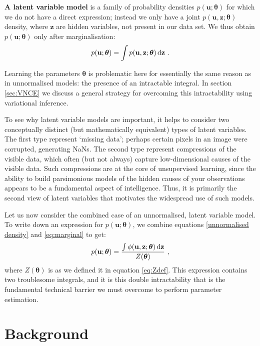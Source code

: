\documentclass[11pt, oneside]{article}
\newcommand{\thetab}{{\boldsymbol{\theta}}}
\newcommand{\pnorm}{p}
\newcommand{\pnn}{\phi}
\renewcommand{\u}{{\mathbf u}}
\newcommand{\z}{{\mathbf z}}
\theoremstyle{definition}
\begin{document}
\textbf{A latent variable model} is a family of probability densities $\pnorm(\u; \thetab)$ for which we do not have a direct expression; instead we only have a joint $\pnorm(\u, \z; \thetab)$ density, where $\z$ are hidden variables, not present in our data set. We thus obtain $\pnorm(\u; \thetab)$ only after marginalisation:
\begin{align}
  \pnorm(\u; \thetab) = \int \pnorm(\u, \z;\thetab) \dif \z \ .
  \label{eq:marginal}
\end{align}

Learning the parameters $\thetab$ is problematic here for essentially the same reason as in unnormalised models: the presence of an intractable integral. In section \ref{sec:VNCE} we discuss a general strategy for overcoming this intractability using variational inference.

To see why latent variable models are important, it helps to consider two conceptually distinct (but mathematically equivalent) types of latent variables. The first type represent `missing data’; perhaps certain pixels in an image were corrupted, generating NaNs. The second type represent compressions of the visible data, which often (but not always) capture low-dimensional causes of the visible data. Such compressions are at the core of unsupervised learning, since the ability to build parsimonious models of the hidden causes of your observations appears to be a fundamental aspect of intelligence. Thus, it is primarily the second view of latent variables that motivates the widespread use of such models. 

Let us now consider the combined case of an unnormalised, latent variable model. To write down an expression for $\pnorm(\u; \thetab)$, we combine equations \ref{unnormalised density} and \ref{eq:marginal} to get:
\begin{align}
    \pnorm(\u; \thetab) = \frac{\int \pnn(\u, \z;\thetab) \dif \z}{Z(\thetab)} \ ,
\end{align}
where $Z(\thetab)$ is as we defined it in equation \ref{eq:Zdef}. This expression contains two troublesome integrals, and it is this double intractability that is the fundamental technical barrier we must overcome to perform parameter estimation.

\newpage
\section{Background}

\end{document}
